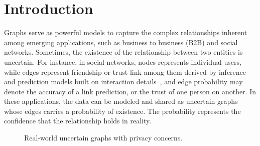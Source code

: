 \section{Introduction}

\label{sec:Intro}

Graphs serve as powerful models to capture the complex relationships inherent among emerging applications, such as business to business (B2B) and social networks. Sometimes, the existence of the relationship between two entities is uncertain. 
For instance, in social networks, nodes represents individual users, while edges represent friendship or trust link among them derived by inference and prediction models built on interaction details~\cite{Lin_B2B,Adar_Managing_2007,Kempe_Maximizing_2003}, and edge probability may denote the accuracy of a link prediction, or the trust of one person on another. 
In these applications, the data can be modeled and shared as uncertain graphs whose edges carries a probability of existence. The probability represents the confidence that the relationship holds in reality. 

\begin{figure}[!htb]
  \vspace{-7pt}
    \vspace{-7pt}
    \caption{Real-world uncertain graphs with privacy concerns.}
    \label{fig:motivation}
    \vspace{-7pt}
\end{figure} 

